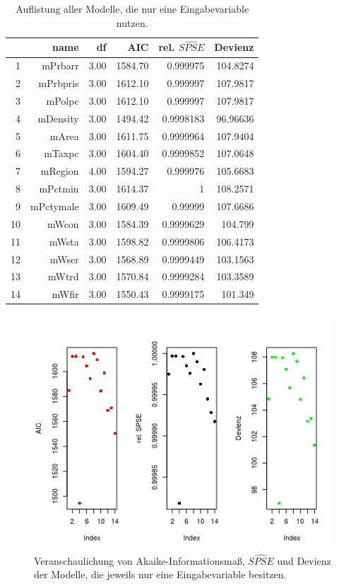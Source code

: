 \begin{table}[ht]
\centering
\begin{tabular}{rrrrrr}
  \hline
  & name & df & AIC & rel. $\hat{SPSE}$ & Devienz \\ 
  \hline
  1 & mPrbarr & 3.00 & 1584.70 & 0.999975 &  104.8274\\ 
  2 & mPrbpris & 3.00 & 1612.10 & 0.999997 & 107.9817 \\ 
  3 & mPolpc & 3.00 & 1612.10 & 0.999997 &  107.9817\\ 
  4 & mDensity & 3.00 & 1494.42 & 0.9998183 &  96.96636\\ 
  5 & mArea & 3.00 & 1611.75 & 0.9999964 &  107.9404\\ 
  6 & mTaxpc & 3.00 & 1604.40 & 0.9999852 & 107.0648 \\ 
  7 & mRegion & 4.00 & 1594.27 &  0.999976 & 105.6683\\ 
  8 & mPctmin & 3.00 & 1614.37 &  1 & 108.2571\\ 
  9 & mPctymale & 3.00 & 1609.49 & 0.99999 &  107.6686\\ 
  10 & mWcon & 3.00 & 1584.39 &  0.9999629 & 104.799\\ 
  11 & mWsta & 3.00 & 1598.82 &  0.9999806 & 106.4173\\ 
  12 & mWser & 3.00 & 1568.89 &  0.9999449 & 103.1563\\ 
  13 & mWtrd & 3.00 & 1570.84 &  0.9999284 & 103.3589\\ 
  14 & mWfir & 3.00 & 1550.43 &  0.9999175 & 101.349\\ 
   \hline
\end{tabular}
\caption{Auflistung aller Modelle, die nur eine Eingabevariable nutzen.}
\label{tab:asv}
\end{table}
 
\begin{figure}
\centering
\includegraphics[scale=.7]{./jpgs/asvc.jpeg}
\caption{Veranschaulichung von Akaike-Informationsma\ss{}, $\hat{SPSE}$ und Devienz der Modelle, die jeweils nur eine Eingabevariable besitzen.}
\label{fig:asv}
\end{figure} 
 
